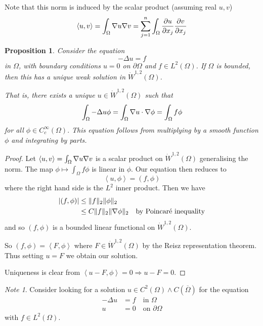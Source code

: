 \documentclass[10pt, oneside, reqno]{amsart}
\theoremstyle{plain}%
\newtheorem{prop}[thm]{Proposition}
\numberwithin{equation}{section}
\theoremstyle{definition}
\theoremstyle{remark}
\newtheorem*{note}{Note}
\newcommand{\iprod}[1]{\left\langle #1 \right\rangle}
\begin{document}
Note that this norm is induced by the scalar product (assuming real $u, v$) \[
	\iprod{u, v} = \int_\Omega \grad u \grad v =  \sum_{j=1}^n \int_\Omega \parder{u}{x_j} \parder{v}{x_j}
\]

\begin{prop}
	Consider the equation 
	\begin{equation}
	-\Delta u = f
	\end{equation} in $\Omega$, with boundary conditions $u = 0$ on $\partial \Omega$ and $f \in L^2(\Omega)$.  If $\Omega$ is bounded, then this has a unique weak solution in $\dot W^{1, 2}(\Omega)$.
	
	That is, there exists a unique $u \in \dot W^{1, 2}(\Omega)$ such that \[
		\int_\Omega - \Delta u \phi = \int_\Omega \nabla u \cdot \nabla \phi = \int_\Omega f \phi
	\]  for all $\phi \in C^\infty_c(\Omega).$  This equation follows from multiplying by a smooth function $\phi$ and integrating by parts. 
\end{prop}

\begin{proof}
	Let $\iprod{u, v} = \int_\Omega \grad u \grad v$ is a scalar product on $\dot W^{1, 2}(\Omega)$ generalising the norm.  The map $\phi \mapsto \int_\Omega f \phi$ is linear in $\phi$.  Our equation then reduces to \[
		\iprod{u, \phi} = \left( f, \phi \right)
	\] where the right hand side is the $L^2$ inner product.  Then we have \begin{align*}
		\left| (f, \phi) \right| &\leq \| f \|_2 \| \phi \|_2 \\
					&\leq C \| f \|_2 \| \nabla \phi \|_2 \quad \text{by Poincar\'e\ inequality}  
	\end{align*} and so $(f, \phi)$ is a bounded linear functional on $\dot W^{1, 2}(\Omega)$.  
	
	So $(f, \phi) = \iprod{F, \phi}$ where $F \in \dot W^{1, 2}(\Omega)$ by the Reisz representation theorem.  Thus setting $u = F$ we obtain our solution.  
	
	Uniqueness is clear from $\iprod{u - F, \phi} = 0 \Rightarrow u - F = 0$.
\end{proof}

\begin{note}
	Consider looking for a solution $u \in C^2(\Omega) \wedge C(\overline\Omega)$ for the equation \begin{align*}
		-\Delta u &= f \quad \text{in $\Omega$}\\
			u &= 0 \quad \text{on $\partial \Omega$}
	\end{align*} with $f \in L^2(\Omega)$.
\end{note}
\end{document}
